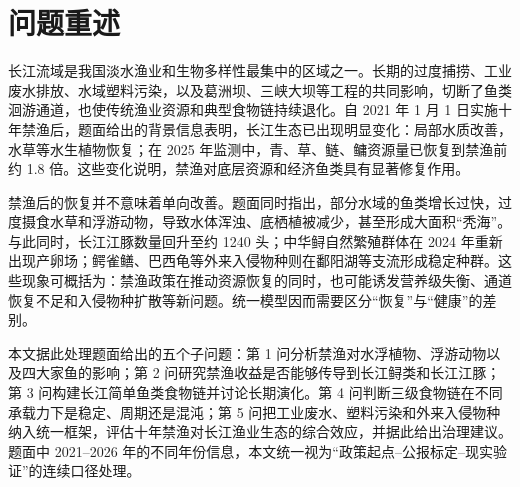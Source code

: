 \documentclass{MMCStyle}
\begin{document}
\begin{abstract}
围绕长江十年禁渔背景下鱼类生态系统的恢复与失衡问题，本文构建了“资源--功能群模块、珍稀物种模块和三级食物链混沌模块”三层框架。首先，用四类底层资源与四大家鱼功能群的耦合常微分方程刻画禁渔后资源与鱼群的传导；其次，用食源约束、人工放流和通道阻隔共同驱动的模型分析长江江豚与长江鲟的恢复过程；再次，用 Hastings-Powell 三级食物链模型展示稳定、周期振荡与更复杂不规则的长期行为，并在问题四中用最大李雅普诺夫指数识别混沌候选区间；最后，将工业污染和外来入侵物种纳入情景扩展。针对问题一，本文进一步引入四大家鱼总量与单网次捕获量代理（CPUE*）作为可观测指标，其中 2025 年“四大家鱼恢复到禁渔前约 1.8 倍”作为硬校准锚点，湖北段“单网次捕获量提升 120\%”仅作为拟合外的一致性检验；结果表明，单区校准后四大家鱼总量在 2025 年达到基线的 1.805 倍，CPUE* 达到 1.838 倍，对应相对误差分别为 0.26\% 和 16.47\%，而模型中的水草末值降至 0.204 倍，提示在当前参数组下恢复伴随底层承压上升。基线修复情景下，江豚和长江鲟末期规模分别达到初值的 1.133 倍和 1.140 倍；在污染与入侵叠加情景下，内部综合健康指数由 0.686 降至 0.575，且权重扰动后前两类情景排序存在交换，提示该指标并非完全稳健。据此，本文建议将“禁渔”与“水质治理、通道修复、定向增殖放流和入侵物种压制”联动实施。
\end{abstract}

\newpage
\tableofcontents
\newpage
{}
\pagestyle{fancy}

\section{问题重述}
长江流域是我国淡水渔业和生物多样性最集中的区域之一。长期的过度捕捞、工业废水排放、水域塑料污染，以及葛洲坝、三峡大坝等工程的共同影响，切断了鱼类洄游通道，也使传统渔业资源和典型食物链持续退化。自 2021 年 1 月 1 日实施十年禁渔后，题面给出的背景信息表明，长江生态已出现明显变化：局部水质改善，水草等水生植物恢复；在 2025 年监测中，青、草、鲢、鳙资源量已恢复到禁渔前约 1.8 倍。这些变化说明，禁渔对底层资源和经济鱼类具有显著修复作用。

禁渔后的恢复并不意味着单向改善。题面同时指出，部分水域的鱼类增长过快，过度摄食水草和浮游动物，导致水体浑浊、底栖植被减少，甚至形成大面积“秃海”。与此同时，长江江豚数量回升至约 1240 头；中华鲟自然繁殖群体在 2024 年重新出现产卵场；鳄雀鳝、巴西龟等外来入侵物种则在鄱阳湖等支流形成稳定种群。这些现象可概括为：禁渔政策在推动资源恢复的同时，也可能诱发营养级失衡、通道恢复不足和入侵物种扩散等新问题。统一模型因而需要区分“恢复”与“健康”的差别\cite{report2022,report2023}。

本文据此处理题面给出的五个子问题：第 1 问分析禁渔对水浮植物、浮游动物以及四大家鱼的影响；第 2 问研究禁渔收益是否能够传导到长江鲟类和长江江豚；第 3 问构建长江简单鱼类食物链并讨论长期演化。第 4 问判断三级食物链在不同承载力下是稳定、周期还是混沌；第 5 问把工业废水、塑料污染和外来入侵物种纳入统一框架，评估十年禁渔对长江渔业生态的综合效应，并据此给出治理建议。题面中 2021--2026 年的不同年份信息，本文统一视为“政策起点--公报标定--现实验证”的连续口径处理\cite{yangtzeA}。
\end{document}
